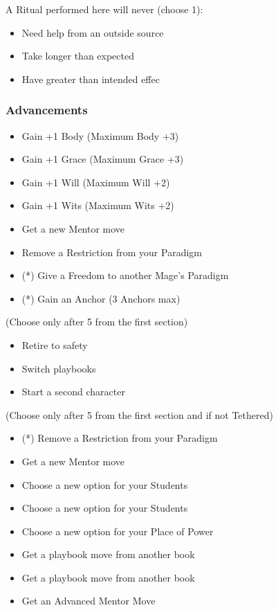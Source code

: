 \documentclass[
]{article}
\providecommand{\tightlist}{%
  \setlength{\itemsep}{0pt}\setlength{\parskip}{0pt}}
\begin{document}
A Ritual performed here will never (choose 1):

\begin{itemize}
\tightlist
\item
  Need help from an outside source
\item
  Take longer than expected
\item
  Have greater than intended effec
\end{itemize}

\hypertarget{advancements-1}{%
\subsubsection{Advancements}\label{advancements-1}}

\begin{itemize}
\tightlist
\item
  Gain +1 Body (Maximum Body +3)
\item
  Gain +1 Grace (Maximum Grace +3)
\item
  Gain +1 Will (Maximum Will +2)
\item
  Gain +1 Wits (Maximum Wits +2)
\item
  Get a new Mentor move
\item
  Remove a Restriction from your Paradigm
\item
  (*) Give a Freedom to another Mage's Paradigm
\item
  (*) Gain an Anchor (3 Anchors max)
\end{itemize}

(Choose only after 5 from the first section)

\begin{itemize}
\tightlist
\item
  Retire to safety
\item
  Switch playbooks
\item
  Start a second character
\end{itemize}

(Choose only after 5 from the first section and if not Tethered)

\begin{itemize}
\tightlist
\item
  (*) Remove a Restriction from your Paradigm
\item
  Get a new Mentor move
\item
  Choose a new option for your Students
\item
  Choose a new option for your Students
\item
  Choose a new option for your Place of Power
\item
  Get a playbook move from another book
\item
  Get a playbook move from another book
\item
  Get an Advanced Mentor Move
\end{itemize}
\end{document}
